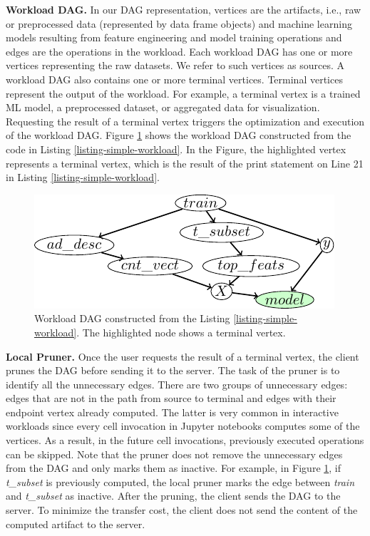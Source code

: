 \textbf{Workload DAG.}
In our DAG representation, vertices are the artifacts, i.e., raw or preprocessed data (represented by data frame objects) and machine learning models resulting from feature engineering and model training operations and edges are the operations in the workload.
Each workload DAG has one or more vertices representing the raw datasets.
We refer to such vertices as sources.
A workload DAG also contains one or more terminal vertices.
Terminal vertices represent the output of the workload.
For example, a terminal vertex is a trained ML model, a preprocessed dataset, or aggregated data for visualization.
Requesting the result of a terminal vertex triggers the optimization and execution of the workload DAG.
Figure \ref{fig-workload-dag} shows the workload DAG constructed from the code in Listing \ref{listing-simple-workload}.
In the Figure, the highlighted vertex represents a terminal vertex, which is the result of the print statement on Line 21 in Listing \ref{listing-simple-workload}.
\begin{figure}
\centering
\includegraphics[width=\linewidth]{../images/tikz-standalone/example-graph}
\caption{Workload DAG constructed from the Listing \ref{listing-simple-workload}. The highlighted node shows a terminal vertex.}
\label{fig-workload-dag}
\end{figure}

\textbf{Local Pruner.}
Once the user requests the result of a terminal vertex, the client prunes the DAG before sending it to the server.
The task of the pruner is to identify all the unnecessary edges.
There are two groups of unnecessary edges: edges that are not in the path from source to terminal and edges with their endpoint vertex already computed.
The latter is very common in interactive workloads since every cell invocation in Jupyter notebooks computes some of the vertices.
As a result, in the future cell invocations, previously executed operations can be skipped.
Note that the pruner does not remove the unnecessary edges from the DAG and only marks them as inactive.
For example, in Figure \ref{fig-workload-dag}, if \textit{t\_subset} is previously computed, the local pruner marks the edge between \textit{train} and \textit{t\_subset} as inactive.
After the pruning, the client sends the DAG to the server.
To minimize the transfer cost, the client does not send the content of the computed artifact to the server.

